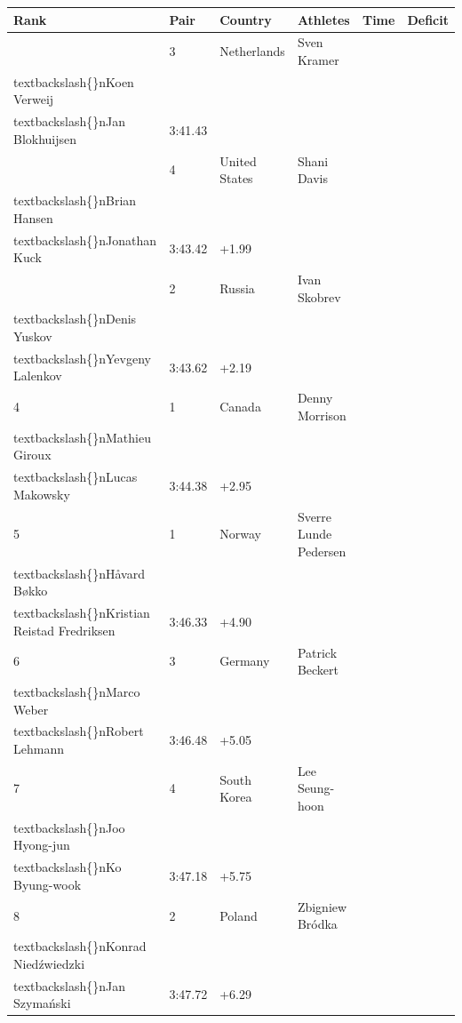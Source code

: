 \documentclass{article}
\begin{document}
\begin{tabular}{llllll}
\toprule
Rank & Pair & Country & Athletes & Time & Deficit \\
\midrule
 & 3 & Netherlands & Sven Kramer\\textbackslash\{\}nKoen Verweij\\textbackslash\{\}nJan Blokhuijsen & 3:41.43 &  \\
 & 4 & United States & Shani Davis\\textbackslash\{\}nBrian Hansen\\textbackslash\{\}nJonathan Kuck & 3:43.42 & +1.99 \\
 & 2 & Russia & Ivan Skobrev\\textbackslash\{\}nDenis Yuskov\\textbackslash\{\}nYevgeny Lalenkov & 3:43.62 & +2.19 \\
4 & 1 & Canada & Denny Morrison\\textbackslash\{\}nMathieu Giroux\\textbackslash\{\}nLucas Makowsky & 3:44.38 & +2.95 \\
5 & 1 & Norway & Sverre Lunde Pedersen\\textbackslash\{\}nHåvard Bøkko\\textbackslash\{\}nKristian Reistad Fredriksen & 3:46.33 & +4.90 \\
6 & 3 & Germany & Patrick Beckert\\textbackslash\{\}nMarco Weber\\textbackslash\{\}nRobert Lehmann & 3:46.48 & +5.05 \\
7 & 4 & South Korea & Lee Seung-hoon\\textbackslash\{\}nJoo Hyong-jun\\textbackslash\{\}nKo Byung-wook & 3:47.18 & +5.75 \\
8 & 2 & Poland & Zbigniew Bródka\\textbackslash\{\}nKonrad Niedźwiedzki\\textbackslash\{\}nJan Szymański & 3:47.72 & +6.29 \\
\bottomrule
\end{tabular}
\end{document}
